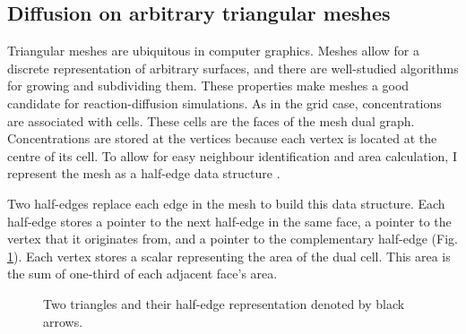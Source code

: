 \begin{figure}[H]
\centering
{}
\end{figure}

\subsection{Diffusion on arbitrary triangular meshes}
Triangular meshes are ubiquitous in computer graphics. Meshes allow for a discrete representation of arbitrary surfaces, and there are well-studied algorithms for growing and subdividing them. These properties make meshes a good candidate for reaction-diffusion simulations. As in the grid case, concentrations are associated with cells. These cells are the faces of the mesh dual graph. Concentrations are stored at the vertices because each vertex is located at the centre of its cell. To allow for easy neighbour identification and area calculation, I represent the mesh as a half-edge data structure \citep{marschner2015}.

Two half-edges replace each edge in the mesh to build this data structure. Each half-edge stores a pointer to the next half-edge in the same face, a pointer to the vertex that it originates from, and a pointer to the complementary half-edge (Fig. \ref{fig:halfEdgeMesh}). Each vertex stores a scalar representing the area of the dual cell. This area is the sum of one-third of each adjacent face's area. %

\begin{figure}[H]
    \centering
    \caption[Two triangles and their half-edge representation denoted by black arrows]{Two triangles and their half-edge representation denoted by black arrows.}
    \label{fig:halfEdgeMesh}
\end{figure}

